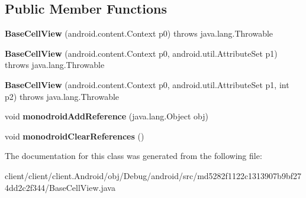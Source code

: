 \subsection*{Public Member Functions}
\begin{DoxyCompactItemize}
\item 
\hypertarget{classmd5282f1122c1313907b9bf274dd2c2f344_1_1BaseCellView_a3c9dc70adc2e0c27cc0871193c9ad5f8}{}{\bfseries Base\+Cell\+View} (android.\+content.\+Context p0)  throws java.\+lang.\+Throwable 	\label{classmd5282f1122c1313907b9bf274dd2c2f344_1_1BaseCellView_a3c9dc70adc2e0c27cc0871193c9ad5f8}

\item 
\hypertarget{classmd5282f1122c1313907b9bf274dd2c2f344_1_1BaseCellView_a4f584c6e2f4e7ba02024c6e5943c9330}{}{\bfseries Base\+Cell\+View} (android.\+content.\+Context p0, android.\+util.\+Attribute\+Set p1)  throws java.\+lang.\+Throwable 	\label{classmd5282f1122c1313907b9bf274dd2c2f344_1_1BaseCellView_a4f584c6e2f4e7ba02024c6e5943c9330}

\item 
\hypertarget{classmd5282f1122c1313907b9bf274dd2c2f344_1_1BaseCellView_a41b102fd841763250ce6999fc9afd37a}{}{\bfseries Base\+Cell\+View} (android.\+content.\+Context p0, android.\+util.\+Attribute\+Set p1, int p2)  throws java.\+lang.\+Throwable 	\label{classmd5282f1122c1313907b9bf274dd2c2f344_1_1BaseCellView_a41b102fd841763250ce6999fc9afd37a}

\item 
\hypertarget{classmd5282f1122c1313907b9bf274dd2c2f344_1_1BaseCellView_a545dc35a3fe62a55d27fd2db19e8e0b2}{}void {\bfseries monodroid\+Add\+Reference} (java.\+lang.\+Object obj)\label{classmd5282f1122c1313907b9bf274dd2c2f344_1_1BaseCellView_a545dc35a3fe62a55d27fd2db19e8e0b2}

\item 
\hypertarget{classmd5282f1122c1313907b9bf274dd2c2f344_1_1BaseCellView_afb7d948e4598dd3db3efe3db0908bea9}{}void {\bfseries monodroid\+Clear\+References} ()\label{classmd5282f1122c1313907b9bf274dd2c2f344_1_1BaseCellView_afb7d948e4598dd3db3efe3db0908bea9}

\end{DoxyCompactItemize}


The documentation for this class was generated from the following file\+:\begin{DoxyCompactItemize}
\item 
client/client/client.\+Android/obj/\+Debug/android/src/md5282f1122c1313907b9bf274dd2c2f344/Base\+Cell\+View.\+java\end{DoxyCompactItemize}
